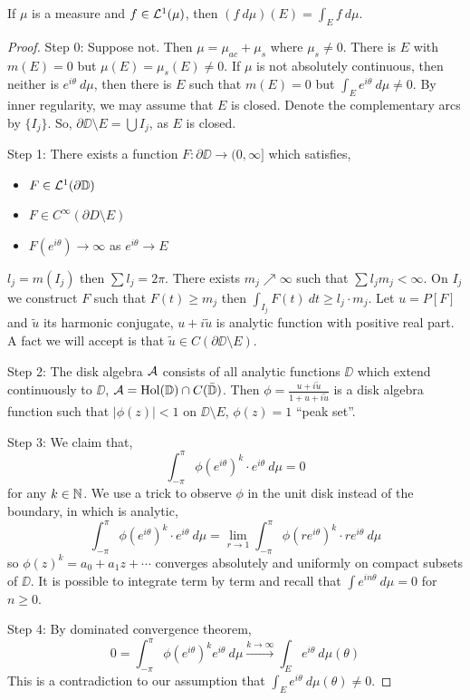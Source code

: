 \begin{definition}
	If $\mu$ is a measure and $f \in \mathcal{L}^1(\mu)$, then $(f\ d \mu)(E) = \int_E f\ d \mu$.
\end{definition}
\begin{proof}
	Step 0:
	Suppose not. Then $\mu = \mu_{ac} + \mu_s$ where $\mu_s \ne 0$.
	There is $E$ with $m(E) = 0$ but $\mu(E) = \mu_s(E) \ne 0$.
	If $\mu$ is not absolutely continuous, then neither is $e^{i \theta}\ d \mu$, then there is $E$ such that $m(E) = 0$ but $\int_E e^{i \theta}\ d \mu \ne 0$.
	By inner regularity, we may assume that $E$ is closed.
	Denote the complementary arcs by $\{ I_j \}$. So, $\partial \DD \setminus E = \bigcup I_j$, as $E$ is closed.

	Step 1:
	There exists a function $F : \partial \DD \to (0, \infty]$ which satisfies,
	\begin{itemize}
		\item $F \in \mathcal{L}^1(\partial \mathbb{D})$
		\item $F \in C^\infty(\partial D \setminus E)$
		\item $F(e^{i \theta}) \to \infty$ as $e^{i \theta} \to E$
	\end{itemize}
	$l_j = m(I_j)$ then $\sum l_j = 2 \pi$. There exists $m_j \nearrow \infty$ such that $\sum l_j m_j < \infty$.
	On $I_j$ we construct $F$ such that $F(t) \ge m_j$ then $\int_{I_j} F(t)\ dt \ge l_j \cdot m_j$.
	Let $u = P[F]$ and $\tilde{u}$ its harmonic conjugate, $u + i \tilde{u}$ is analytic function with positive real part.
	A fact we will accept is that $\tilde{u} \in C(\partial \DD \setminus E)$.

	Step 2:
	The disk algebra $\mathcal{A}$ consists of all analytic functions $\DD$ which extend continuously to $\DD$, $\mathcal{A} = \operatorname{Hol}(\mathbb{D}) \cap C(\bar{\mathbb{D}})$.
	Then $\phi = \frac{u + i \tilde{u}}{1 + u + i \tilde{u}}$ is a disk algebra function such that $|\phi(z)| < 1$ on $\DD \setminus E$, $\phi(z) = 1$ ``peak set''.

	Step 3:
	We claim that,
	\[
		\int_{-\pi}^{\pi} \phi{(e^{i \theta})}^k \cdot e^{i \theta}\ d \mu = 0
	\]
	for any $k \in \mathbb{N}$.
	We use a trick to observe $\phi$ in the unit disk instead of the boundary, in which is analytic,
	\[
		\int_{-\pi}^{\pi} \phi{(e^{i \theta})}^k \cdot e^{i \theta}\ d \mu
		= \lim_{r \to 1} \int_{-\pi}^{\pi} \phi{(r e^{i \theta})}^k \cdot r e^{i \theta}\ d \mu
	\]
	so $\phi {(z)}^k = a_0 + a_1 z + \cdots$ converges absolutely and uniformly on compact subsets of $\DD$.
	It is possible to integrate term by term and recall that $\int e^{i n \theta}\ d \mu = 0$ for $n \ge 0$.

	Step 4:
	By dominated convergence theorem,
	\[
		0 = \int_{-\pi}^{\pi} \phi{(e^{i \theta})}^k e^{i \theta}\ d \mu
		\xrightarrow{k \to \infty} 
		\int_E e^{i \theta}\ d \mu(\theta)
	\]
	This is a contradiction to our assumption that $\int_E e^{i \theta}\ d \mu(\theta) \ne 0$.
\end{proof}
